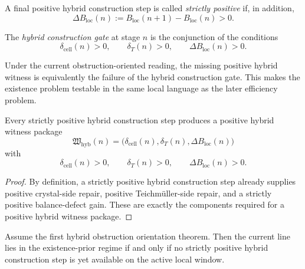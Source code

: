 \begin{definition}
\label{def:strictly-positive-hybrid-construction}
A final positive hybrid construction step is called \emph{strictly positive} if, in addition,
\[
 \Delta B_{\mathrm{loc}}(n)
 :=
 B_{\mathrm{loc}}(n+1)-B_{\mathrm{loc}}(n)
 >0.
\]
\end{definition}

\begin{definition}
\label{def:hybrid-construction-gate}
The \emph{hybrid construction gate} at stage $n$ is the conjunction of the conditions
\[
 \delta_{\mathrm{cell}}(n)>0,
 \qquad
 \delta_T(n)>0,
 \qquad
 \Delta B_{\mathrm{loc}}(n)>0.
\]
\end{definition}

\begin{remark}
\label{rem:existence-obstruction-as-gate-failure}
Under the current obstruction-oriented reading, the missing positive hybrid witness is equivalently the failure of the hybrid construction gate.
This makes the existence problem testable in the same local language as the later efficiency problem.
\end{remark}

\begin{proposition}
\label{prop:positive-hybrid-witness-construction-implies-witness-existence}
Every strictly positive hybrid construction step produces a positive hybrid witness package
\[
 \mathfrak W_{\mathrm{hyb}}(n)
 =
 \bigl(
 \delta_{\mathrm{cell}}(n),
 \delta_T(n),
 \Delta B_{\mathrm{loc}}(n)
 \bigr)
\]
with
\[
 \delta_{\mathrm{cell}}(n)>0,
 \qquad
 \delta_T(n)>0,
 \qquad
 \Delta B_{\mathrm{loc}}(n)>0.
\]
\end{proposition}

\begin{proof}
By definition, a strictly positive hybrid construction step already supplies positive crystal-side repair, positive Teichm\"uller-side repair, and a strictly positive balance-defect gain.
These are exactly the components required for a positive hybrid witness package.
\end{proof}

\begin{proposition}
\label{prop:current-existence-obstruction-equivalent-to-absence-of-construction}
Assume the first hybrid obstruction orientation theorem.
Then the current line lies in the existence-prior regime if and only if no strictly positive hybrid construction step is yet available on the active local window.
\end{proposition}


